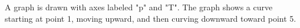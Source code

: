 A graph is drawn with axes labeled "p" and "T". The graph shows a curve starting at point 1, moving upward, and then curving downward toward point 5.